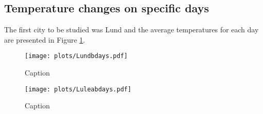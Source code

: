 \subsection{Temperature changes on specific days}
The first city to be studied was Lund and the average temperatures for each day are presented in Figure \ref{fig:lund}. 
\begin{figure}
    \centering
    \texttt{[image: plots/Lundbdays.pdf]}
    \caption{Caption}
    \label{fig:lund}
\end{figure}

\begin{figure}
    \centering
    \texttt{[image: plots/Luleabdays.pdf]}
    \caption{Caption}
    \label{fig:luleå}
\end{figure}

